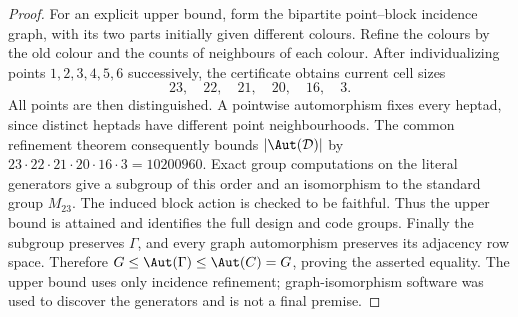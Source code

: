 \begin{proof}
For an explicit upper bound, form the bipartite point--block incidence
graph, with its two parts initially given different colours. Refine the
colours by the old colour and the counts of neighbours of each colour.
After individualizing points $1,2,3,4,5,6$ successively, the certificate
obtains current cell sizes
\[
 23,\quad22,\quad21,\quad20,\quad16,\quad3.
\]
All points are then distinguished. A pointwise automorphism fixes every
heptad, since distinct heptads have different point neighbourhoods.
The common refinement theorem \cite[Theorem~6.4]{U} consequently bounds $|\Aut(\mathcal D)|$ by $23\cdot22\cdot21\cdot20\cdot16\cdot3=10200960$.
Exact group computations on the literal generators give a subgroup of
this order and an isomorphism to the standard group $M_{23}$.
The induced block action is checked to be faithful. Thus the upper bound
is attained and identifies the full design and code groups. Finally the
subgroup preserves $\Gamma$, and every graph automorphism preserves its
adjacency row space. Therefore
$G\leq\Aut(\Gamma)\leq\Aut(C)=G$, proving the asserted equality.
The upper bound uses only incidence refinement; graph-isomorphism
software was used to discover the generators and is not a final premise.
\end{proof}

